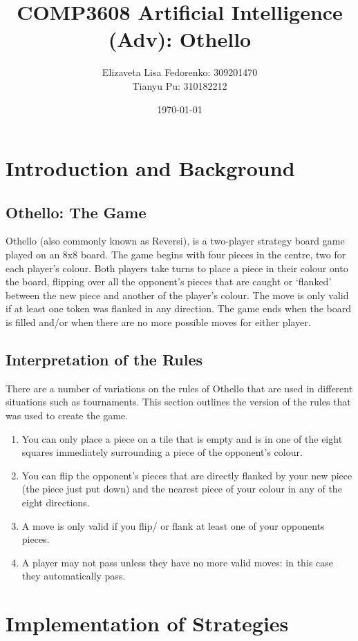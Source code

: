 \documentclass[12pt]{article}
\title{COMP3608 Artificial Intelligence (Adv): Othello}
\author{Elizaveta Lisa Fedorenko: 309201470
\\ Tianyu Pu: 310182212}
\date{\today}
\begin{document}
\maketitle

\begin{abstract}
\end{abstract}

\section{Introduction and Background}
\subsection{Othello: The Game}
Othello (also commonly known as Reversi), is a two-player strategy board game played on an 8x8 board.
The game begins with four pieces in the centre, two for each player's colour. Both players take turns
to place a piece in their colour onto the board, flipping over all the opponent's pieces that are caught
or `flanked' between the new piece and another of the player's colour. The move is only valid if at
least one token was flanked in any direction. The game ends when the board is filled and/or when there are
no more possible moves for either player.

\subsection{Interpretation of the Rules}
There are a number of variations on the rules of Othello that are used in different situations such as
tournaments. This section outlines the version of the rules that was used to create the game.
\begin{enumerate}
 \item You can only place a piece on a tile that is empty and is in one of the eight squares immediately
 surrounding a piece of the opponent's colour.
 \item You can flip the opponent's pieces that are directly flanked by your new piece (the piece just
 put down) and the nearest piece of your colour in any of the eight directions.
 \item A move is only valid if you flip/ or flank at least one of your opponents pieces.
 \item A player may not pass unless they have no more valid moves: in this case they automatically pass.
\end{enumerate}

\section{Implementation of Strategies}
\end{document}
